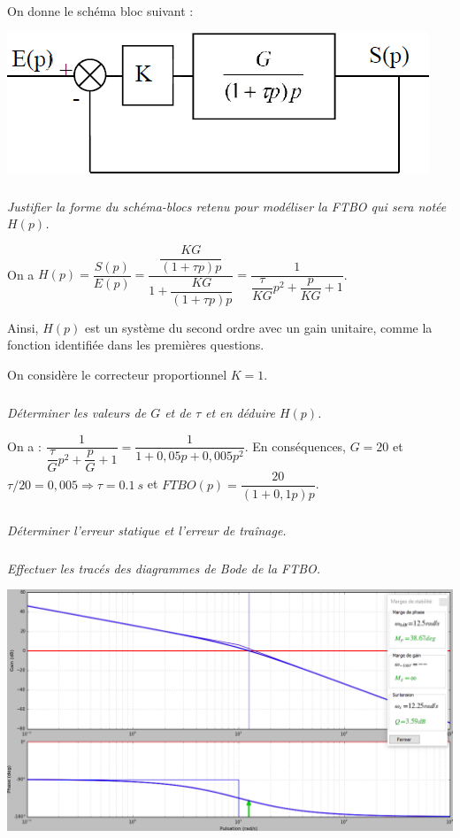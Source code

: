 \documentclass[10pt,fleqn]{article} %
\begin{document}
\begin{multicols}{2}
\begin{obj}
\end{obj}

On donne le schéma bloc suivant :

\begin{center}
\includegraphics[width=.6\linewidth]{images/fig_02}
\end{center}

\subparagraph{}\textit{Justifier la forme du schéma-blocs retenu pour modéliser la FTBO qui sera notée $H(p)$.}
\ifprof
\begin{corrige}
On a $H(p)=\dfrac{S(p)}{E(p)}
=\dfrac{\dfrac{KG}{\left(1+\tau p\right)p}}{1+\dfrac{KG}{\left(1+\tau p\right)p}}
=\dfrac{1}{\dfrac{\tau}{KG} p^2+\dfrac{p}{KG}+1}$.

Ainsi, $H(p)$ est un système du second ordre avec un gain unitaire, comme la fonction identifiée dans les premières questions. 
\end{corrige}
\else
\fi

On considère le correcteur proportionnel $K=1$. 
\subparagraph{}\textit{Déterminer les valeurs de $G$ et de $\tau$ et en déduire $H(p)$.}
\ifprof
\begin{corrige}
On a :
$\dfrac{1}{\dfrac{\tau}{G} p^2+\dfrac{p}{G}+1}
= \dfrac{1}{1+0,05p+0,005p^2}$. En conséquences, $G=20$ et $\tau/20=0,005 \Rightarrow \tau=\SI{0,1}{s}$ et $FTBO(p)=\dfrac{20}{(1+0,1p)p}$.

\end{corrige}
\else
\fi

\subparagraph{}\textit{Déterminer l'erreur statique et l'erreur de traînage.}

\subparagraph{}\textit{Effectuer les tracés des diagrammes de Bode de la FTBO.}
\ifprof
\begin{corrige}

\begin{center}
\includegraphics[width=\linewidth]{images/cor_01}
\end{center}
\end{corrige}
\else
\fi


\end{multicols}
\end{document}
